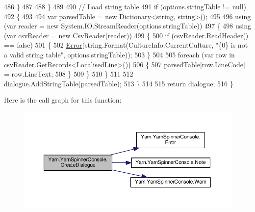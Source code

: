 \begin{DoxyCode}
486                 \}
487 
488             \}
489 
490             \textcolor{comment}{// Load string table}
491             \textcolor{keywordflow}{if} (options.stringTable != null)
492             \{
493 
494                 var parsedTable = \textcolor{keyword}{new} Dictionary<string, string>();
495 
496                 \textcolor{keyword}{using} (var reader = \textcolor{keyword}{new} System.IO.StreamReader(options.stringTable))
497                 \{
498                     \textcolor{keyword}{using} (var csvReader = \textcolor{keyword}{new} \hyperlink{a00077}{CsvReader}(reader))
499                     \{
500                         \textcolor{keywordflow}{if} (csvReader.ReadHeader() == \textcolor{keyword}{false})
501                         \{
502                             \hyperlink{a00195_a2f63f9f5b7634cb50ee75ff2eb18b137}{Error}(\textcolor{keywordtype}{string}.Format(CultureInfo.CurrentCulture, \textcolor{stringliteral}{"\{0\} is not a valid string
       table"}, options.stringTable));
503                         \}
504 
505                         \textcolor{keywordflow}{foreach} (var row \textcolor{keywordflow}{in} csvReader.GetRecords<LocalisedLine>())
506                         \{
507                             parsedTable[row.LineCode] = row.LineText;
508                         \}
509                     \}
510                 \}
511 
512                 dialogue.AddStringTable(parsedTable);
513             \}
514 
515             \textcolor{keywordflow}{return} dialogue;
516         \}
\end{DoxyCode}


Here is the call graph for this function\-:
\nopagebreak
\begin{figure}[H]
\begin{center}
\leavevmode
\includegraphics[width=350pt]{a00195_aab244361a510cee18ad2f636d110e0d5_cgraph}
\end{center}
\end{figure}




